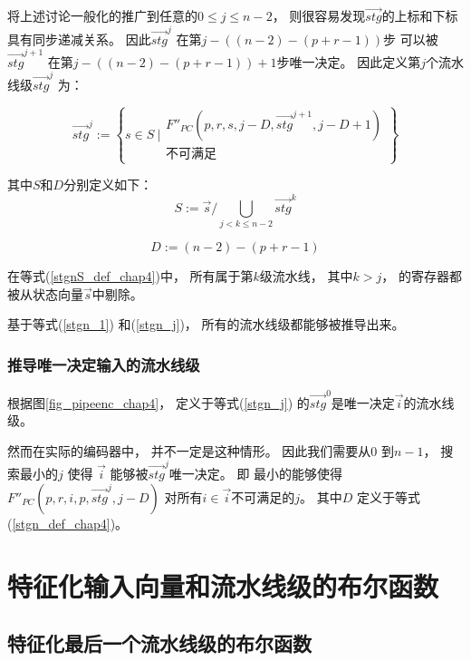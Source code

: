 将上述讨论一般化的推广到任意的$0\le j\le n-2$，
则很容易发现$\vec{stg}$的上标和下标具有同步递减关系。
因此$\vec{stg}^j$ 在第$j-((n-2)-(p+r-1))$步
可以被$\vec{stg}^{j+1}$ 在第$j-((n-2)-(p+r-1))+1$步唯一决定。
因此定义第$j$个流水线级$\vec{stg}^j$ 为：

\begin{equation}\label{stgn_j}
\vec{stg}^{j} :=
 \left\{
 s\in S ~|
\begin{array}{cc}
 F''_{PC}(p,r,s,j-D,\vec{stg}^{j+1},j-D+1)\\
不可满足
\end{array}
\right\}
\end{equation}

其中$S$和$D$分别定义如下：
\begin{equation}\label{stgnS_def_chap4}
S              :=  \vec{s}/\bigcup_{j<k\le n-2}\vec{stg}^{k}
\end{equation}

\begin{equation}\label{stgn_def_chap4}
D              :=  (n-2)-(p+r-1)
\end{equation}

在等式(\ref{stgnS_def_chap4})中，
所有属于第$k$级流水线，
其中$k>j$，
的寄存器都被从状态向量$\vec{s}$中剔除。

基于等式(\ref{stgn_1}) 和(\ref{stgn_j})，
所有的流水线级都能够被推导出来。

\subsubsection{推导唯一决定输入的流水线级}\label{subsec_inferinput}

根据图\ref{fig_pipeenc_chap4}，
定义于等式(\ref{stgn_j}) 的$\vec{stg}^0$是唯一决定$\vec{i}$的流水线级。

然而在实际的编码器中，
并不一定是这种情形。
因此我们需要从$0$ 到$n-1$，
搜索最小的$j$ 使得
$\vec{i}$ 能够被$\vec{stg}^j$唯一决定。
即
最小的能够使得$F''_{PC}(p,r,i,p,\vec{stg}^{j},j-D)$ 对所有$i\in \vec{i}$不可满足的$j$。
其中$D$ 定义于等式(\ref{stgn_def_chap4})。

\section{特征化输入向量和流水线级的布尔函数}\label{sec_char_chap4}
\subsection{特征化最后一个流水线级的布尔函数}

